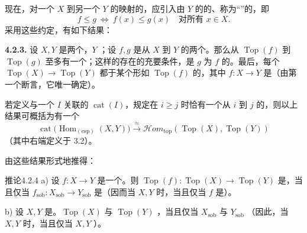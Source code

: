 现在，对一个 $X$ 到另一个 $Y$ 的映射的，应引入由 $Y$ 的的、称为“”的，即
\[
 f\leq g\ \Longleftrightarrow\ f(x)\leq g(x)\quad\text{对所有 }x\in X.
\]
采用这些约定，有如下结果：

\textbf{4.2.3.} 设 $X,Y$ 是两个，$Y$ ；设 $f,g$ 是从 $X$ 到 $Y$ 的两个。那么从 $\operatorname{Top}(f)$ 到 $\operatorname{Top}(g)$ 至多有一个；这样的存在的充要条件，是 $g$ 为 $f$ 的。最后，每个 $\operatorname{Top}(X)\to\operatorname{Top}(Y)$ 都于某个形如 $\operatorname{Top}(f)$ 的，其中 $f:X\to Y$ 是（由第一个断言，它唯一确定）。

若定义与一个 $I$ 关联的 $\operatorname{cat}(I)$，规定在 $i\geq j$ 时恰有一个从 $i$ 到 $j$ 的，则以上结果可概括为有一个
\[
 \operatorname{cat}\bigl(\operatorname{Hom}_{(\mathrm{esp})}(X,Y)\bigr)\xrightarrow{\approx}\mathscr Hom_{\mathrm{top}}(\operatorname{Top}(X),\operatorname{Top}(Y))
\]
（其中右端定义于 3.2）。

由这些结果形式地推得：
\begin{SGAresult}{推论}{4.2.4}
 a) 设 $f:X\to Y$ 是一个。则 $\operatorname{Top}(f):\operatorname{Top}(X)\to\operatorname{Top}(Y)$ 是，当且仅当 $f_{\mathrm{sob}}:X_{\mathrm{sob}}\to Y_{\mathrm{sob}}$ 是（因而当 $X,Y$ 时，当且仅当 $f$ 是）。

 b) 设 $X,Y$ 是。$\operatorname{Top}(X)$ 与 $\operatorname{Top}(Y)$ ，当且仅当 $X_{\mathrm{sob}}$ 与 $Y_{\mathrm{sob}}$ （因此，当 $X,Y$ 时，当且仅当 $X,Y$ ）。
\end{SGAresult}

